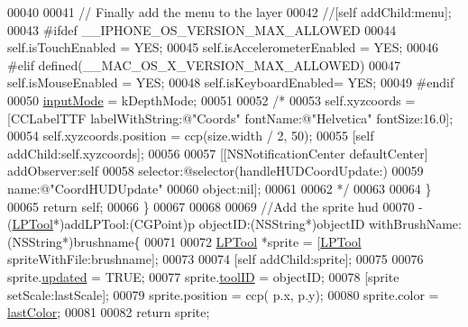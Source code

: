 \begin{DoxyCode}
00040         
00041         \textcolor{comment}{// Finally add the menu to the layer}
00042         \textcolor{comment}{//[self addChild:menu];}
00043 \textcolor{preprocessor}{#ifdef \_\_IPHONE\_OS\_VERSION\_MAX\_ALLOWED}
00044 \textcolor{preprocessor}{}        \textcolor{keyword}{self}.isTouchEnabled = YES;
00045         \textcolor{keyword}{self}.isAccelerometerEnabled = YES;
00046 \textcolor{preprocessor}{#elif defined(\_\_MAC\_OS\_X\_VERSION\_MAX\_ALLOWED)}
00047 \textcolor{preprocessor}{}        \textcolor{keyword}{self}.isMouseEnabled = YES;
00048         \textcolor{keyword}{self}.isKeyboardEnabled= YES;
00049 \textcolor{preprocessor}{#endif}
00050 \textcolor{preprocessor}{}        \hyperlink{interface_h_u_d_layer_a1e506792d581032644d75804beb359a7}{inputMode} = kDepthMode;
00051         
00052         \textcolor{comment}{/*}
00053 \textcolor{comment}{        self.xyzcoords = [CCLabelTTF labelWithString:@"Coords" fontName:@"Helvetica" fontSize:16.0];}
00054 \textcolor{comment}{        self.xyzcoords.position = ccp(size.width / 2, 50);}
00055 \textcolor{comment}{        [self addChild:self.xyzcoords];}
00056 \textcolor{comment}{        }
00057 \textcolor{comment}{        [[NSNotificationCenter defaultCenter] addObserver:self}
00058 \textcolor{comment}{                                                 selector:@selector(handleHUDCoordUpdate:)}
00059 \textcolor{comment}{                                                     name:@"CoordHUDUpdate"}
00060 \textcolor{comment}{                                                   object:nil];}
00061 \textcolor{comment}{         }
00062 \textcolor{comment}{         */}
00063         
00064     \}
00065     \textcolor{keywordflow}{return} \textcolor{keyword}{self};
00066 \}
00067 
00068 
00069 \textcolor{comment}{//Add the sprite hud}
00070 - (\hyperlink{interface_l_p_tool}{LPTool}*)addLPTool:(CGPoint)p objectID:(NSString*)objectID withBrushName:(NSString*)brushname\{
00071     
00072     \hyperlink{interface_l_p_tool}{LPTool} *sprite = [\hyperlink{interface_l_p_tool}{LPTool} spriteWithFile:brushname];
00073     
00074     [\textcolor{keyword}{self} addChild:sprite];
00075     
00076     sprite.\hyperlink{interface_l_p_tool_a25dbad647c537177b138bdbbb01936e4}{updated} = TRUE;
00077     sprite.\hyperlink{interface_l_p_tool_aafbd850bbcc6c8e33ba201d45a8107c2}{toolID} = objectID;
00078     [sprite setScale:lastScale];
00079     sprite.position = ccp( p.x, p.y);
00080     sprite.color = \hyperlink{interface_h_u_d_layer_a2d27bf64876ea6f0b2f0d1b9013c1cd7}{lastColor};
00081     
00082     \textcolor{keywordflow}{return} sprite;

\end{DoxyCode}
